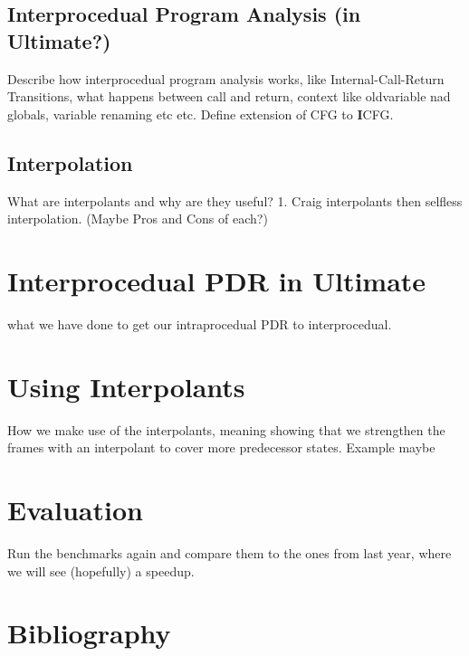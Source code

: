 \documentclass{article}
\begin{document}
	\subsection{Interprocedual Program Analysis (in Ultimate?)}
	Describe how interprocedual program analysis works, like Internal-Call-Return Transitions, what happens between call and return, context like oldvariable nad globals, variable renaming etc etc. Define extension of CFG to \textbf{I}CFG.
	
	\subsection{Interpolation}
	What are interpolants and why are they useful? 1. Craig interpolants then selfless interpolation.
	(Maybe Pros and Cons of each?)
	
	
	\section{Interprocedual PDR in Ultimate}
	what we have done to get our intraprocedual PDR to interprocedual.
	
	\section{Using Interpolants}
	How we make use of the interpolants, meaning showing that we strengthen the frames with an interpolant to cover more predecessor states. Example maybe
	
	\section{Evaluation}
	Run the benchmarks again and compare them to the ones from last year, where we will see (hopefully) a speedup.
	
	\section{Bibliography}

	
\end{document}
